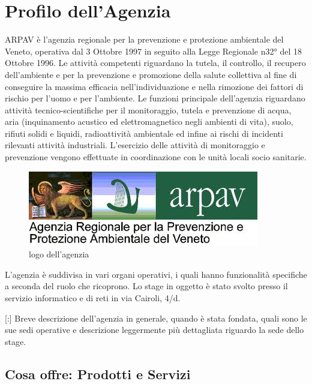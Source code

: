 \chapter{Profilo dell'Agenzia}
\label{1.0}
\thispagestyle{fancy} 

ARPAV è l'agenzia regionale per la prevenzione e protezione ambientale del Veneto, operativa dal 3 Ottobre 1997 in seguito alla Legge Regionale n32° del 18 Ottobre 1996.
Le attività competenti riguardano la tutela, il controllo, il recupero dell'ambiente e per la prevenzione e promozione della salute collettiva al fine di conseguire la massima efficacia nell'individuazione e nella rimozione dei fattori di rischio per l'uomo e per l'ambiente. Le funzioni principale dell'agenzia riguardano attività tecnico-scientifiche per il monitoraggio, tutela e prevenzione di acqua, aria (inquinamento acustico ed elettromagnetico negli ambienti di vita), suolo, rifiuti solidi e liquidi, radioattività ambientale ed infine ai rischi di incidenti rilevanti attività industriali. L'esercizio delle attività di monitoraggio e prevenzione vengono effettuate in coordinazione con le unità locali socio sanitarie.

\begin{figure}[htbp]
	\centering
	\includegraphics[scale=0.7]{./capitoli/capitolo1/img/logoARPAV.jpg}
	\caption{logo dell'agenzia}
\end{figure}

L'agenzia è suddivisa in vari organi operativi, i quali hanno funzionalità specifiche a seconda del ruolo che ricoprono. Lo stage in oggetto è stato svolto presso il servizio informatico e di reti in via Cairoli, 4/d.




[:] Breve descrizione dell'agenzia in generale, quando è stata fondata, quali sono le sue sedi operative e descrizione leggermente più dettagliata riguardo la sede dello stage.

\section{Cosa offre: Prodotti e Servizi}

